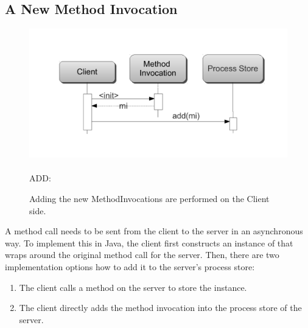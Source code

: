 \subsection{A New Method Invocation}
\label{sec:add}

\begin{figure}[t]
\includegraphics[scale=0.36]{figs/seq-diag-1}
~\\[-3.5cm]ADD:\\[2.5cm]
  \caption{Adding the new MethodInvocations are performed on the Client side.}
  \label{fig:add}
\end{figure}


A method call needs to be sent from the client to the server in an asynchronous way. 
To implement this in Java, the client first constructs an instance of
\MethodInvocation that wraps around the original method call for the server.
Then, 
%
there are two implementation options how to add it to the server's process store:
\begin{enumerate}
  \item The client calls a method on the server to store the instance.
  \item The client directly adds the method invocation into the process
store of the server. 
\end{enumerate}

